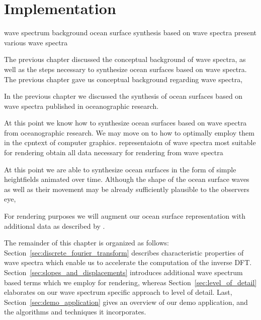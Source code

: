 \chapter{Implementation}
\label{ch:implementation}

wave spectrum background
ocean surface synthesis based on wave spectra
present various wave spectra

The previous chapter discussed the conceptual background of wave spectra,
as well as the steps necessary to synthesize ocean surfaces based on wave spectra.
The previous chapter gave us conceptual background regarding wave spectra,

In the previous chapter we discussed the synthesis of ocean surfaces based
on wave spectra published in oceanographic research.

At this point we know how to synthesize ocean surfaces based on wave spectra
from oceanographic research. We may move on to how to optimally employ them in the
cpntext of computer graphics. 
representaiotn of wave spectra most suitable for rendering
obtain all data necessary for rendering from wave spectra

At this point we are able to synthesize ocean surfaces in the form of simple
heightfields animated over time.
Although the shape of the ocean surface waves as well as their movement
may be already sufficiently plausible to the observers eye, 

For rendering purposes we will augment our ocean surface representation with
additional data as described by \citet{course:simulatingocean}.

%
%
%

The remainder of this chapter is organized as follows:
Section~\ref{sec:discrete_fourier_transform} describes characteristic properties of
wave spectra which enable us to accelerate the computation of the inverse DFT.
Section~\ref{sec:slopes_and_displacements} introduces additional wave spectrum
based terms which we employ for rendering, whereas
Section~\ref{sec:level_of_detail} elaborates on our wave spectrum specific
approach to level of detail. Last, Section~\ref{sec:demo_application} gives an
overview of our demo application, and the algorithms and techniques it incorporates.

